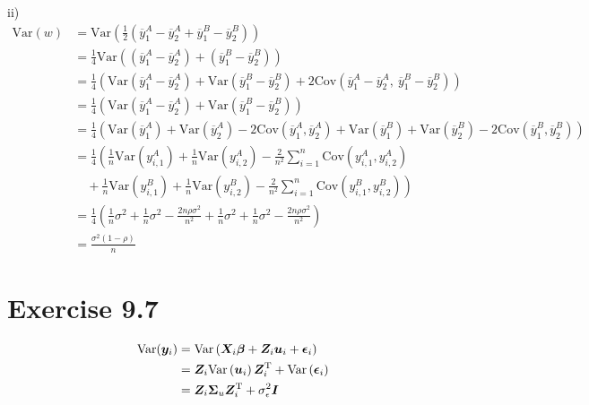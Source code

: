 \documentclass[a4paper]{article}
\newcommand{\Var}{\mathrm{Var}}
\newcommand{\Cov}{\mathrm{Cov}}
\begin{document}
ii)
\begin{align*}
\Var(w) &= \Var\left(\frac{1}{2}\left(\overline{y}_{1}^{A}-\overline{y}_{2}^{A}+\overline{y}_{1}^{B}-\overline{y}_{2}^{B}\right)\right)\\
&= \frac{1}{4}\Var\left(\left(\overline{y}_{1}^{A}-\overline{y}_{2}^{A}\right) +\left(\overline{y}_{1}^{B}-\overline{y}_{2}^{B}\right)\right)\\
&= \frac{1}{4}\left(\Var\left(\overline{y}_{1}^{A}-\overline{y}_{2}^{A}\right) + \Var\left(\overline{y}_{1}^{B}-\overline{y}_{2}^{B}\right) +2\Cov\left(\overline{y}_{1}^{A}-\overline{y}_{2}^{A},~ \overline{y}_{1}^{B}-\overline{y}_{2}^{B}\right)\right)\\
&= \frac{1}{4}\left(\Var\left(\overline{y}_{1}^{A}-\overline{y}_{2}^{A}\right) + \Var\left(\overline{y}_{1}^{B}-\overline{y}_{2}^{B}\right)\right)\\
&= \frac{1}{4}\left(\Var\left(\overline{y}_{1}^{A}\right)+\Var\left(\overline{y}_{2}^{A}\right) -2\Cov\left(\overline{y}_{1}^{A}, \overline{y}_{2}^{A}\right) + \Var\left(\overline{y}_{1}^{B}\right)+\Var\left(\overline{y}_{2}^{B}\right) -2\Cov\left(\overline{y}_{1}^{B}, \overline{y}_{2}^{B}\right)\right)\\
&= \frac{1}{4}\left(\frac{1}{n}\Var\left(y_{i,1}^{A}\right)+\frac{1}{n}\Var\left(y_{i,2}^{A}\right) -\frac{2}{n^{2}}\sum_{i=1}^{n}\Cov\left(y_{i,1}^{A}, y_{i,2}^{A}\right)\right.\\
&\quad +\left. \frac{1}{n}\Var\left(y_{i,1}^{B}\right)+\frac{1}{n}\Var\left(y_{i,2}^{B}\right) -\frac{2}{n^{2}}\sum_{i=1}^{n}\Cov\left(y_{i,1}^{B}, y_{i,2}^{B}\right) \right)\\
&= \frac{1}{4}\left(\frac{1}{n}\sigma^{2}+\frac{1}{n}\sigma^{2} -\frac{2n\rho\sigma^{2}}{n^{2}}+ \frac{1}{n}\sigma^{2}+\frac{1}{n}\sigma^{2} -\frac{2n\rho\sigma^{2}}{n^{2}}\right)\\
&= \frac{\sigma^{2}(1-\rho)}{n}
\end{align*}



\vspace{\baselineskip}
\section{Exercise 9.7}
\begin{align*}
\Var(\bm{y}_{i}) &= \Var\left(\bm{X}_{i}\bm{\beta} + \bm{Z}_{i}\bm{u}_{i} + \bm{\epsilon}_{i}\right)\\
&= \bm{Z}_{i}\Var\left(\bm{u}_{i}\right)\bm{Z}_{i}^{\rm T} + \Var\left(\bm{\epsilon}_{i}\right)\\
&= \bm{Z}_{i}\bm{\Sigma}_{u}\bm{Z}_{i}^{\rm T} + \sigma_{\epsilon}^{2}\bm{I}\\
\end{align*}
\end{document}

